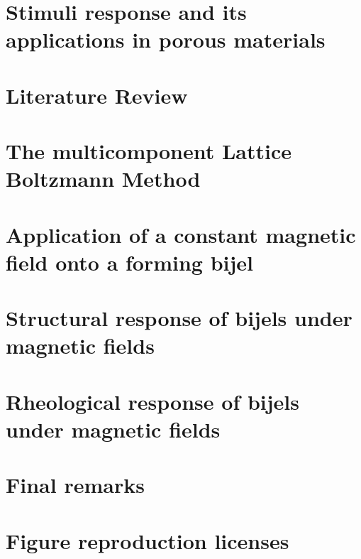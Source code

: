 \documentclass{udthesis}
\begin{document}


\chapter{Stimuli response and its applications in porous materials}


\chapter{Literature Review}


\chapter{The multicomponent Lattice Boltzmann Method}




\chapter{Application of a constant magnetic field onto a forming bijel}


\chapter{Structural response of bijels under magnetic fields}


\chapter{Rheological response of bijels under magnetic fields}


\chapter{Final remarks}


\newpage

\chapter{Figure reproduction licenses}


\newpage



\end{document}
